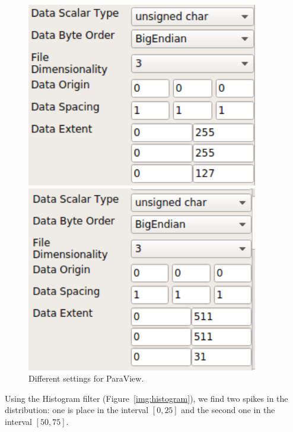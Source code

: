 \documentclass[a4paper]{article}
\begin{document}
\begin{figure}[htbp]
    \centering
	\begin{minipage}{0.45\textwidth}
        \centering
        \includegraphics[width=0.9\textwidth]{res/settings_a.png} %
    \end{minipage}\hfill
    \begin{minipage}{0.45\textwidth}
        \centering
        \includegraphics[width=0.9\textwidth]{res/settings_b.png} %
	\end{minipage}
\caption{Different settings for ParaView.}
\label{img:settings}
\end{figure}

Using the Histogram filter (Figure~\ref{img:histogram}), we find two spikes in the distribution: one is place in the interval $[0, 25]$ and the second one in the interval $[50, 75]$.
\end{document}
